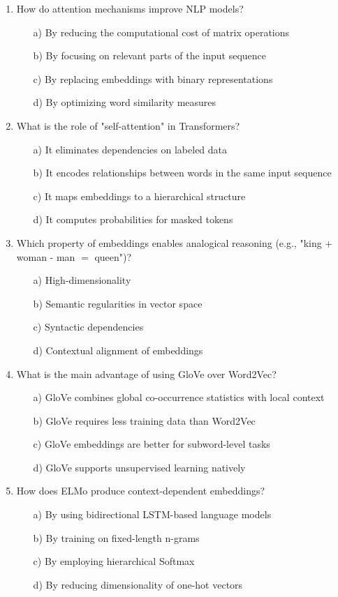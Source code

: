\documentclass[8pt]{extarticle}
\begin{document}
\begin{multicols}{2}
\begin{enumerate}
\item How do attention mechanisms improve NLP models?
\begin{itemize}
\item[a)] By reducing the computational cost of matrix operations
\item[b)] By focusing on relevant parts of the input sequence
\item[c)] By replacing embeddings with binary representations
\item[d)] By optimizing word similarity measures
\end{itemize}

\item What is the role of "self-attention" in Transformers?
\begin{itemize}
\item[a)] It eliminates dependencies on labeled data
\item[b)] It encodes relationships between words in the same input sequence
\item[c)] It maps embeddings to a hierarchical structure
\item[d)] It computes probabilities for masked tokens
\end{itemize}

\item Which property of embeddings enables analogical reasoning (e.g., "king + woman - man $=$ queen")?
\begin{itemize}
\item[a)] High-dimensionality
\item[b)] Semantic regularities in vector space
\item[c)] Syntactic dependencies
\item[d)] Contextual alignment of embeddings
\end{itemize}

\item What is the main advantage of using GloVe over Word2Vec?
\begin{itemize}
\item[a)] GloVe combines global co-occurrence statistics with local context
\item[b)] GloVe requires less training data than Word2Vec
\item[c)] GloVe embeddings are better for subword-level tasks
\item[d)] GloVe supports unsupervised learning natively
\end{itemize}

\item How does ELMo produce context-dependent embeddings?
\begin{itemize}
\item[a)] By using bidirectional LSTM-based language models
\item[b)] By training on fixed-length n-grams
\item[c)] By employing hierarchical Softmax
\item[d)] By reducing dimensionality of one-hot vectors
\end{itemize}


\end{enumerate}
\end{multicols}
\end{document}
